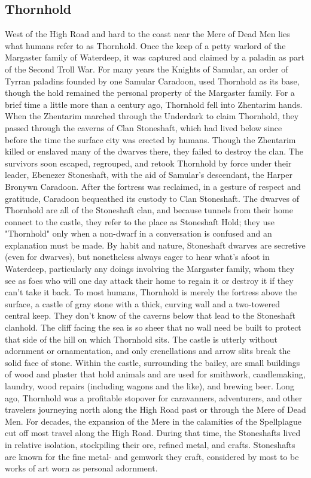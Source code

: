 \documentclass[10pt,a4paper,twoside,twocolumn,openany,bg=print,nodeprecatedcode]{dndbook}
\begin{document}
\subsection{Thornhold}
West of the High Road and hard to the coast near the Mere of Dead Men lies what humans refer to as Thornhold. Once the keep of a petty warlord of the Margaster family of Waterdeep, it was captured and claimed by a paladin as part of the Second Troll War. For many years the Knights of Samular, an order of Tyrran paladins founded by one Samular Caradoon, used Thornhold as its base, though the hold remained the personal property of the Margaster family.
For a brief time a little more than a century ago, Thornhold fell into Zhentarim hands. When the Zhentarim marched through the Underdark to claim Thornhold, they passed through the caverns of Clan Stoneshaft, which had lived below since before the time the surface city was erected by humans. Though the Zhentarim killed or enslaved many of the dwarves there, they failed to destroy the clan. The survivors soon escaped, regrouped, and retook Thornhold by force under their leader, Ebenezer Stoneshaft, with the aid of Samular's descendant, the Harper Bronywn Caradoon. After the fortress was reclaimed, in a gesture of respect and gratitude, Caradoon bequeathed its custody to Clan Stoneshaft.
The dwarves of Thornhold are all of the Stoneshaft clan, and because tunnels from their home connect to the castle, they refer to the place as Stoneshaft Hold; they use "Thornhold" only when a non-dwarf in a conversation is confused and an explanation must be made. By habit and nature, Stoneshaft dwarves are secretive (even for dwarves), but nonetheless always eager to hear what's afoot in Waterdeep, particularly any doings involving the Margaster family, whom they see as foes who will one day attack their home to regain it or destroy it if they can't take it back.
To most humans, Thornhold is merely the fortress above the surface, a castle of gray stone with a thick, curving wall and a two-towered central keep. They don't know of the caverns below that lead to the Stoneshaft clanhold. The cliff facing the sea is so sheer that no wall need be built to protect that side of the hill on which Thornhold sits. The castle is utterly without adornment or ornamentation, and only crenellations and arrow slits break the solid face of stone. Within the castle, surrounding the bailey, are small buildings of wood and plaster that hold animals and are used for smithwork, candlemaking, laundry, wood repairs (including wagons and the like), and brewing beer.
Long ago, Thornhold was a profitable stopover for caravanners, adventurers, and other travelers journeying north along the High Road past or through the Mere of Dead Men. For decades, the expansion of the Mere in the calamities of the Spellplague cut off most travel along the High Road. During that time, the Stoneshafts lived in relative isolation, stockpiling their ore, refined metal, and crafts. Stoneshafts are known for the fine metal- and gemwork they craft, considered by most to be works of art worn as personal adornment.
\end{document}
